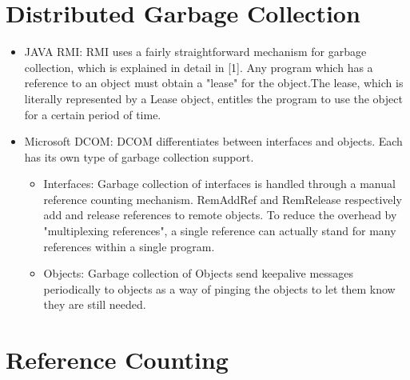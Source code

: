 \documentclass[a4paper, 14pt]{article}
\begin{document}
\section{Distributed Garbage Collection}
\begin{itemize}
\item JAVA RMI: RMI uses a fairly straightforward mechanism for garbage collection, which is explained in detail in [1]. Any program which has a reference to an object must obtain a "lease" for the object.The lease, which is literally represented by a Lease object, entitles the program to use the object for a certain period of time.

\item Microsoft DCOM: DCOM differentiates between interfaces and objects. Each has its own type of garbage collection support.
    \begin{itemize}
    \item Interfaces: Garbage collection of interfaces is handled through a manual reference counting mechanism. RemAddRef and RemRelease respectively add and release references to remote objects. To reduce the overhead by "multiplexing references", a single reference can actually stand for many references within a single program.
    \item Objects: Garbage collection of Objects send keepalive messages periodically to objects as a way of pinging the objects to let them know they are still needed.
    \end{itemize}
\end{itemize}

\section{Reference Counting}
\end{document}
